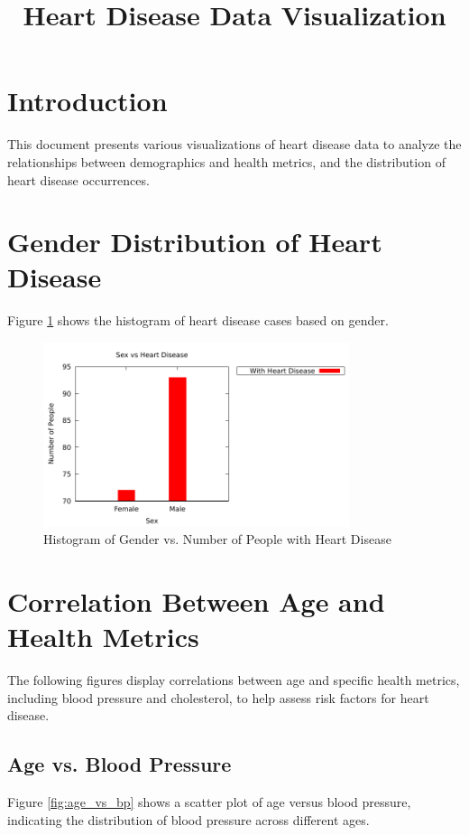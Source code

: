 \documentclass{article}
\title{Heart Disease Data Visualization}
\author{}
\date{}
\begin{document}
	
	\maketitle
	
	\section{Introduction}
	This document presents various visualizations of heart disease data to analyze the relationships between demographics and health metrics, and the distribution of heart disease occurrences.
	
	\section{Gender Distribution of Heart Disease}
	Figure \ref{fig:gender_histogram} shows the histogram of heart disease cases based on gender.
	
	\begin{figure}[h]
		\centering
		\includegraphics[width=0.8\textwidth]{4a.pdf}
		\caption{Histogram of Gender vs. Number of People with Heart Disease}
		\label{fig:gender_histogram}
	\end{figure}
	
	\section{Correlation Between Age and Health Metrics}
	
	The following figures display correlations between age and specific health metrics, including blood pressure and cholesterol, to help assess risk factors for heart disease.
	
	\subsection{Age vs. Blood Pressure}
	Figure \ref{fig:age_vs_bp} shows a scatter plot of age versus blood pressure, indicating the distribution of blood pressure across different ages.
	
\end{document}
